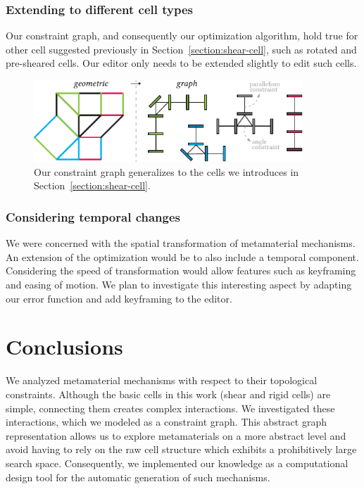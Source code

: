\subsubsection{Extending to different cell types}
Our constraint graph, and consequently our optimization algorithm, hold true for other cell suggested previously in Section~\ref{section:shear-cell}, such as rotated and pre-sheared cells. Our editor only needs to be extended slightly to edit such cells.
 
\begin{figure} [h]
    \centering
    \includegraphics[width=0.9\textwidth]{chapters/understanding-metamaterial-mechanisms-FIG/20-generalized-2D-constraint-graph.pdf}
    \caption[Short figure name.]{Our constraint graph generalizes to the cells we introduces in Section~\ref{section:shear-cell}.
    \label{fig:20-generalized-2D-constraint-graph}}
\end{figure}

\subsubsection{Considering temporal changes}
We were concerned with the spatial transformation of metamaterial mechanisms. An extension of the optimization would be to also include a temporal component. Considering the speed of transformation would allow features such as keyframing and easing of motion. We plan to investigate this interesting aspect by adapting our error function and add keyframing to the editor.


\section{Conclusions}

We analyzed metamaterial mechanisms with respect to their topological constraints. Although the basic cells in this work (shear and rigid cells) are simple, connecting them creates complex interactions. We investigated these interactions, which we modeled as a constraint graph. This abstract graph representation allows us to explore metamaterials on a more abstract level and avoid having to rely on the raw cell structure which exhibits a prohibitively large search space. Consequently, we implemented our knowledge as a computational design tool for the automatic generation of such mechanisms. 

